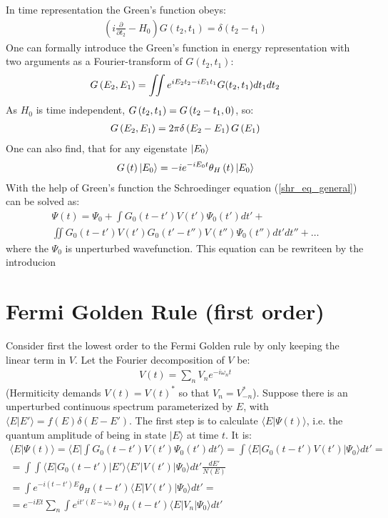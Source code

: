 In time representation the Green's function obeys:
\begin{gather}
	\left(i\frac{\partial}{\partial t_{2}}-H_{0}\right)G(t_{2},t_{1})=\delta(t_{2}-t_{1})
\end{gather}
One can formally introduce the Green's function in energy representation with two arguments as a Fourier-transform of $ G(t_{2},t_{1}) $:
\begin{gather}
	G\left(E_2,E_1\right)
	=
	\iint
	e^{iE_2t_2-iE_1t_1}
	G(t_{2},t_{1})
	dt_1
	dt_2
\end{gather}
As $ H_0 $ is time independent, $ G\left(t_2,t_1\right)=G\left(t_2-t_1,0\right) $, so:
\begin{gather}
	G\left(E_2,E_1\right)=2\pi \delta\left(E_2-E_1\right) G\left(E_1\right)
\end{gather}
One can also find, that for any eigenstate $ \ket{E_0} $
\begin{gather}
	G\left(t\right)\ket{E_0}
	=
	-ie^{-iE_0t}\theta_H\left(t\right)\ket{E_0}
\end{gather}
With the help of Green's function the Schroedinger equation (\ref{shr_eq_general}) can be solved as:
\begin{multline}
\label{general_expression_for the_wavefunction}
\Psi(t)=\Psi_{0}+\int G_{0}(t-t')V(t')\Psi_{0}(t')dt'+
\\
\iint G_{0}(t-t')V(t')G_{0}(t'-t'')V(t'')\Psi_{0}(t'')dt'dt''+\dots
\end{multline}
where the $ \Psi_0 $ is unperturbed wavefunction. This equation can be rewriteen  by the introducion 
\section{Fermi Golden Rule (first order)}

Consider first the lowest order to the Fermi Golden rule by only keeping the linear term in $ V $. Let the Fourier decomposition of $ V $ be:
\begin{gather}
	V(t)=\sum_n V_{n}e^{-i\omega_{n}t}
\end{gather}
(Hermiticity demands $ V(t)=V(t)^{*} $ so that $ V_{n}=V_{-n}^{*} $). Suppose there is an unperturbed continuous spectrum parameterized by $ E $, with $ \langle E|E'\rangle=f(E)\delta(E-E') $. The first step is to calculate $ \langle E|\Psi(t)\rangle $, i.e. the quantum amplitude of being in state $ |E\rangle $ at time $ t $. It is:
\begin{multline}
	\langle E|\Psi(t)\rangle=\langle E|\int G_{0}(t-t')V(t')\Psi_{0}(t')dt'\rangle=\int\langle E|G_{0}(t-t')V(t')|\Psi_{0}\rangle dt'=\\=\int\int\langle E|G_{0}(t-t')|E'\rangle\langle E'|V(t')|\Psi_{0}\rangle dt'\frac{dE'}{N(E)}
	\\=\int e^{-i(t-t')E}\theta_{H}(t-t')\langle E|V(t')|\Psi_{0}\rangle dt'=\\=e^{-iEt}\sum_{n}\int e^{it'(E-\omega_{n})}\theta_{H}(t-t')\langle E|V_{n}|\Psi_{0}\rangle dt'
\end{multline}

